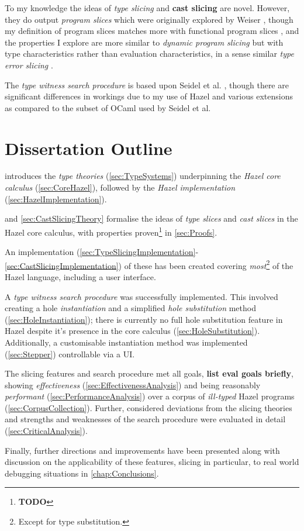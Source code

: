 To my knowledge the ideas of \textit{type slicing} and \textbf{cast slicing} are novel. However, they do output \textit{program slices} which were originally explored by Weiser \cite{ProgSlice}, though my definition of program slices matches more with functional program slices \cite{FunctionalProgExplain}, and the properties I explore are more similar to \textit{dynamic program slicing} \cite{DynProgSlice} but with type characteristics rather than evaluation characteristics, in a sense similar \textit{type error slicing} \cite{ErrSlice}.

The \textit{type witness search procedure} is	 based upon Seidel et al. \cite{SearchProc}, though there are significant differences in workings due to my use of Hazel and various extensions as compared to the subset of OCaml used by Seidel et al.

\section{Dissertation Outline}
\label{sec:Outline}
 introduces the \textit{type theories} (\cref{sec:TypeSystems}) underpinning the \textit{Hazel core calculus} (\cref{sec:CoreHazel}), followed by the \textit{Hazel implementation} (\cref{sec:HazelImplementation}).

 and \cref{sec:CastSlicingTheory} formalise the ideas of \textit{type slices} and \textit{cast slices} in the Hazel core calculus, with properties proven\footnote{\textbf{TODO}} in \cref{sec:Proofs}. 
 
 An implementation (\cref{sec:TypeSlicingImplementation}-\ref{sec:CastSlicingImplementation}) of these has been created covering \textit{most}\footnote{Except for type substitution.} of the Hazel language, including a user interface. 
 
 A \textit{type witness search procedure} was successfully implemented. This involved creating a hole \textit{instantiation} and a simplified \textit{hole substitution} method (\cref{sec:HoleInstantiation}); there is currently no full hole substitution feature in Hazel despite it's presence in the core calculus (\cref{sec:HoleSubstitution}). Additionally, a customisable instantiation method was implemented (\cref{sec:Stepper}) controllable via a UI.

The slicing features and search procedure met all goals, \textbf{list eval goals briefly}, showing \textit{effectiveness} (\cref{sec:EffectivenessAnalysis}) and being reasonably \textit{performant} (\cref{sec:PerformanceAnalysis}) over a corpus of \textit{ill-typed} Hazel programs (\cref{sec:CorpusCollection}). Further, considered deviations from the slicing theories and strengths and weaknesses of the search procedure were evaluated in detail (\cref{sec:CriticalAnalysis}).

Finally, further directions and improvements have been presented along with discussion on the applicability of these features, slicing in particular, to real world debugging situations in \cref{chap:Conclusions}.